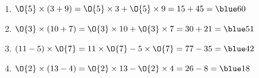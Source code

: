    \ \\ [-5mm]
   \begin{enumerate}
      \item $\O{5}\times(3+9) =\O{5}\times3+\O{5}\times9 =15+45 =\blue 60$
      \item $\O{3}\times(10+7) =\O{3}\times10+\O{3}\times7 =30+21 =\blue 51$
      \item $(11-5)\times\O{7} =11\times\O{7}-5\times\O{7} =77-35 =\blue 42$
      \item $\O{2}\times(13-4) =\O{2}\times13-\O{2}\times4 =26-8 =\blue 18$
   \end{enumerate}
